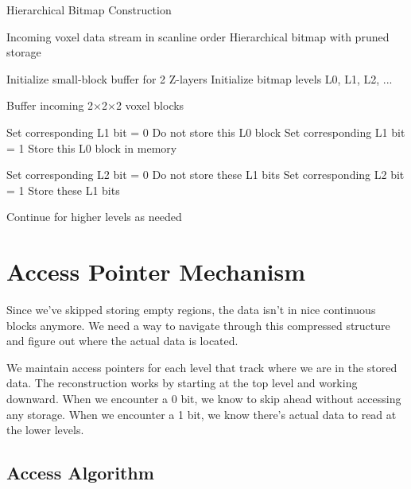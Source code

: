 \documentclass[12pt]{article}
\begin{document}
\begin{algorithm}
\caption{Hierarchical Bitmap Construction}
\begin{algorithmic}
\REQUIRE Incoming voxel data stream in scanline order
\ENSURE Hierarchical bitmap with pruned storage

\STATE Initialize small-block buffer for 2 Z-layers
\STATE Initialize bitmap levels L0, L1, L2, ...

    \STATE Buffer incoming 2×2×2 voxel blocks
    
        \STATE Set corresponding L1 bit = 0
        \STATE Do not store this L0 block
    \ELSE
        \STATE Set corresponding L1 bit = 1
        \STATE Store this L0 block in memory
    \ENDIF
    
            \STATE Set corresponding L2 bit = 0
            \STATE Do not store these L1 bits
        \ELSE
            \STATE Set corresponding L2 bit = 1
            \STATE Store these L1 bits
        \ENDIF
    \ENDIF
    
    \STATE Continue for higher levels as needed
\ENDWHILE
\end{algorithmic}
\end{algorithm}

\section{Access Pointer Mechanism}

Since we've skipped storing empty regions, the data isn't in nice continuous blocks anymore. We need a way to navigate through this compressed structure and figure out where the actual data is located.

We maintain access pointers for each level that track where we are in the stored data. The reconstruction works by starting at the top level and working downward. When we encounter a 0 bit, we know to skip ahead without accessing any storage. When we encounter a 1 bit, we know there's actual data to read at the lower levels.

\subsection{Access Algorithm}
\end{document}
